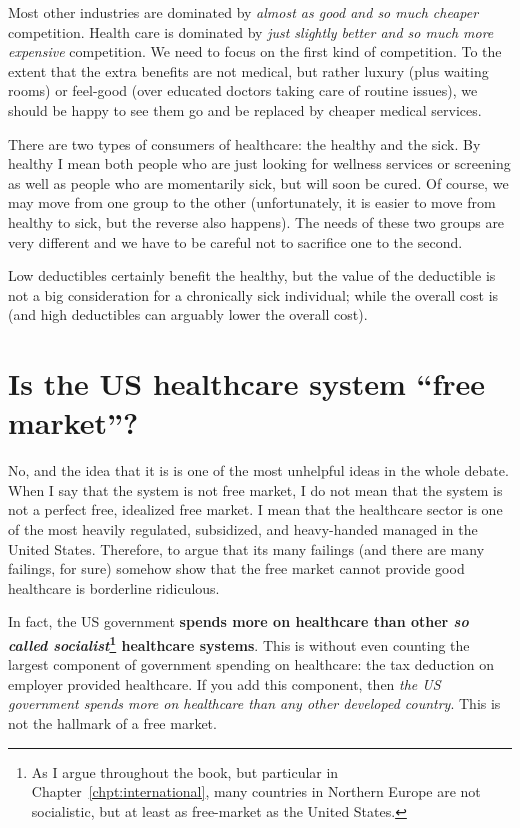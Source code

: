 Most other industries are dominated by \emph{almost as good and so much
cheaper} competition. Health care is dominated by \emph{just slightly better
and so much more expensive} competition. We need to focus on the first kind of
competition. To the extent that the extra benefits are not medical, but rather
luxury (plus waiting rooms) or feel-good (over educated doctors taking care of
routine issues), we should be happy to see them go and be replaced by cheaper
medical services.

There are two types of consumers of healthcare: the healthy and the sick. By
healthy I mean both people who are just looking for wellness services or
screening as well as people who are momentarily sick, but will soon be cured.
Of course, we may move from one group to the other (unfortunately, it is easier
to move from healthy to sick, but the reverse also happens). The needs of
these two groups are very different and we have to be careful not to sacrifice
one to the second.

Low deductibles certainly benefit the healthy, but the value of the deductible
is not a big consideration for a chronically sick individual; while the overall
cost is (and high deductibles can arguably lower the overall cost).

\section{Is the US healthcare system ``free market''?}

No, and the idea that it is is one of the most unhelpful ideas in the whole
debate. When I say that the system is not free market, I do not mean that the
system is not a perfect free, idealized free market. I mean that the healthcare
sector is one of the most heavily regulated, subsidized, and heavy-handed
managed in the United States. Therefore, to argue that its many failings (and
there are many failings, for sure) somehow show that the free market cannot
provide good healthcare is borderline ridiculous.

In fact, the US government \textbf{spends more on healthcare than other
\emph{so called socialist}\footnote{As I argue throughout the book, but
particular in Chapter~\ref{chpt:international}, many countries in Northern
Europe are not socialistic, but at least as free-market as the United States.}
healthcare systems}. This is without even counting the largest component of
government spending on healthcare: the tax deduction
on employer provided healthcare. If you add this component, then \emph{the US
government spends more on healthcare than any other developed country}. This is
not the hallmark of a free market. %

